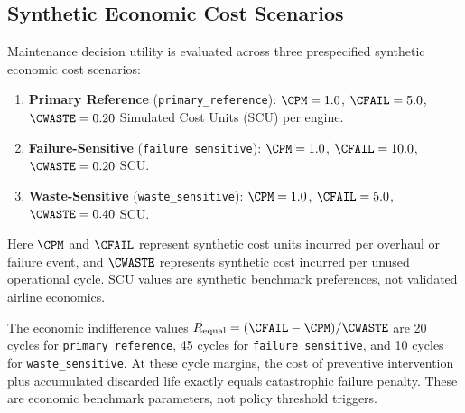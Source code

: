 
\subsection*{Synthetic Economic Cost Scenarios}
Maintenance decision utility is evaluated across three prespecified synthetic economic cost scenarios:
\begin{enumerate}
    \item \textbf{Primary Reference} (\texttt{primary\_reference}): $\CPM = 1.0$, $\CFAIL = 5.0$, $\CWASTE = 0.20$ Simulated Cost Units (SCU) per engine.
    \item \textbf{Failure-Sensitive} (\texttt{failure\_sensitive}): $\CPM = 1.0$, $\CFAIL = 10.0$, $\CWASTE = 0.20$ SCU.
    \item \textbf{Waste-Sensitive} (\texttt{waste\_sensitive}): $\CPM = 1.0$, $\CFAIL = 5.0$, $\CWASTE = 0.40$ SCU.
\end{enumerate}
Here $\CPM$ and $\CFAIL$ represent synthetic cost units incurred per overhaul or failure event, and $\CWASTE$ represents synthetic cost incurred per unused operational cycle. SCU values are synthetic benchmark preferences, not validated airline economics.

The economic indifference values $R_{\text{equal}} = (\CFAIL - \CPM)/\CWASTE$ are 20 cycles for \texttt{primary\_reference}, 45 cycles for \texttt{failure\_sensitive}, and 10 cycles for \texttt{waste\_sensitive}. At these cycle margins, the cost of preventive intervention plus accumulated discarded life exactly equals catastrophic failure penalty. These are economic benchmark parameters, not policy threshold triggers.

